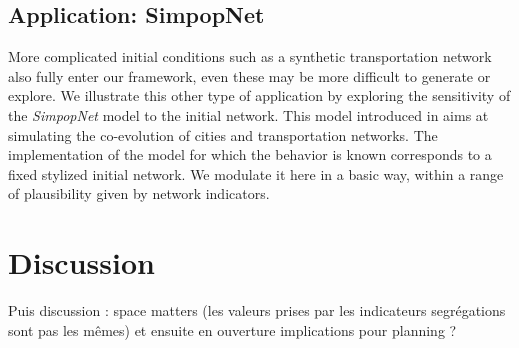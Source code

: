 \documentclass[a4paper,12pt]{article}
\begin{document}
\subsection{Application: SimpopNet}

More complicated initial conditions such as a synthetic transportation network also fully enter our framework, even these may be more difficult to generate or explore. We illustrate this other type of application by exploring the sensitivity of the \emph{SimpopNet} model to the initial network. This model introduced in \cite{schmitt2014modelisation} aims at simulating the co-evolution of cities and transportation networks. The implementation of the model for which the behavior is known corresponds to a fixed stylized initial network. We modulate it here in a basic way, within a range of plausibility given by network indicators.








\section{Discussion}

Puis discussion : space matters (les valeurs prises par les indicateurs segrégations sont pas les mêmes) et ensuite en ouverture implications pour planning ?








\end{document}
